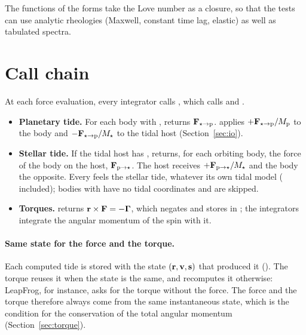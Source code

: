 The functions of the forms take the Love number as a closure, so that the tests can use analytic rheologies (Maxwell, constant time lag, elastic) as well as tabulated spectra.

\section{Call chain}\label{sec:pos-flow}
At each force evaluation, every integrator calls , which calls  and .
\begin{itemize}
  \item \textbf{Planetary tide.} For each body with ,  returns $\mathbf F_{\star\to\mathrm p}$.  applies $+\mathbf F_{\star\to\mathrm p}/M_{\mathrm p}$ to the body and $-\mathbf F_{\star\to\mathrm p}/M_\star$ to the tidal host (Section~\ref{sec:io}).
  \item \textbf{Stellar tide.} If the tidal host has ,  returns, for each orbiting body, the force of the body on the host, $\mathbf F_{{\rm p}\to\star}$. The host receives $+\mathbf F_{{\rm p}\to\star}/M_\star$ and the body the opposite. Every  feels the stellar tide, whatever its own tidal model ( included); bodies with  have no tidal coordinates and are skipped.
  \item \textbf{Torques.}  returns $\mathbf r\times\mathbf F=-\boldsymbol\Gamma$, which  negates and stores in ; the integrators integrate the angular momentum of the spin with it.
\end{itemize}

\paragraph{Same state for the force and the torque.} Each computed tide is stored with the state $(\mathbf r,\mathbf v,\mathbf s)$ that produced it (). The torque reuses it when the state is the same, and recomputes it otherwise: LeapFrog, for instance, asks for the torque without the force. The force and the torque therefore always come from the same instantaneous state, which is the condition for the conservation of the total angular momentum (Section~\ref{sec:torque}).

